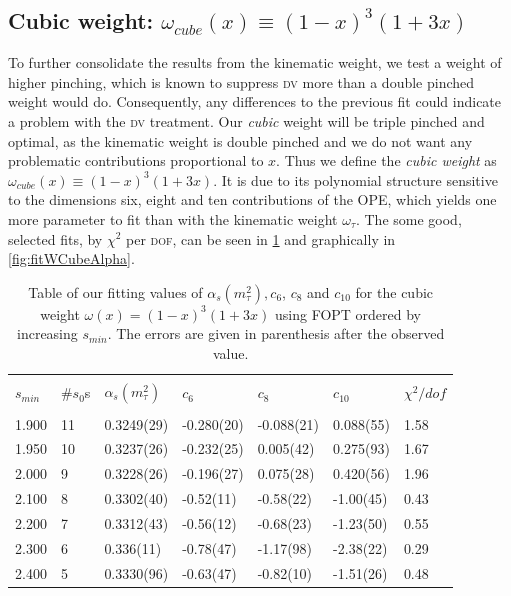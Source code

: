 \documentclass[../../index.tex]{subfiles}
\begin{document}
\subsection{Cubic weight: $\omega_{cube}(x) \equiv (1-x)^3(1+3x)$}
\label{sec:cubicWeight}
To further consolidate the results from the kinematic weight, we test
a weight of higher pinching, which is known to suppress \textsc{dv} more than a
double pinched weight would do. Consequently, any differences to the previous
fit could indicate a problem with the \textsc{dv} treatment. Our \textit{cubic}
weight will be triple pinched and optimal, as the kinematic weight is double
pinched and we do not want any problematic contributions proportional to $x$.
Thus we define the \textit{cubic weight} as $\omega_{cube}(x) \equiv
(1-x)^3(1+3x)$. It is due to its polynomial structure sensitive to the dimensions
six, eight and ten contributions of the \textsc{OPE}, which yields one more parameter to fit
than with the kinematic weight $\omega_\tau$. The some good, selected fits, by
$\chi^2$ per \textsc{dof}, can be seen in \cref{table:fitWCubicAlD6D8D10} and
graphically in \cref{fig:fitWCubeAlpha}.
\begin{table}
  \centering
  \begin{tabular}{lllllll}
    \toprule \\
    $s_{min}$ & \#$s_0$s & $\alpha_s(m_\tau^2)$ & $c_6$ & $c_8$ & $c_{10}$ & $\chi^2/dof$  \\
    \hline \\
    1.900 & 11 & 0.3249(29) & -0.280(20) & -0.088(21) & 0.088(55) & 1.58 \\
    1.950 & 10 & 0.3237(26) & -0.232(25) & 0.005(42) & 0.275(93) & 1.67 \\
    2.000 & 9 & 0.3228(26) & -0.196(27) & 0.075(28) & 0.420(56) & 1.96 \\
    \rowcolor{primary}
    2.100 & 8 & 0.3302(40) & -0.52(11) & -0.58(22) & -1.00(45) & 0.43 \\
    \rowcolor{primary}
    2.200 & 7 & 0.3312(43) & -0.56(12) & -0.68(23) & -1.23(50) & 0.55 \\
    \rowcolor{primary}
    2.300 & 6 & 0.336(11) & -0.78(47) & -1.17(98) & -2.38(22) & 0.29 \\
    \rowcolor{primary}
    2.400 & 5 & 0.3330(96) & -0.63(47) & -0.82(10) & -1.51(26) & 0.48 \\
    \bottomrule
  \end{tabular}
  \caption{Table of our fitting values of $\alpha_s(m_\tau^2), c_6$, $c_8$ and
    $c_{10}$ for the cubic weight $\omega(x)=(1-x)^3(1+3x)$ using FOPT ordered
    by increasing $s_{min}$. The errors are given in parenthesis after the observed value.}
  \label{table:fitWCubicAlD6D8D10}
\end{table}
\end{document}
